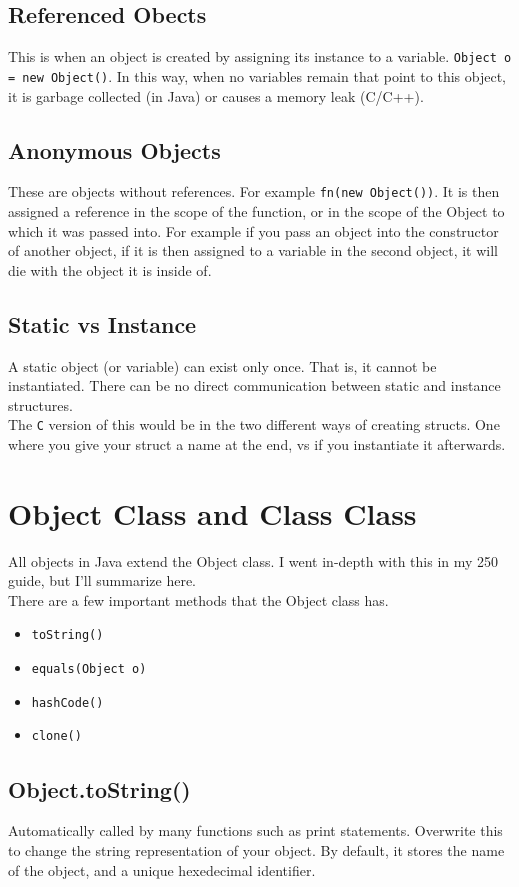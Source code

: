 \documentclass[12pt]{article}
\theoremstyle{definition}
\begin{document}
\subsection{Referenced Obects}
This is when an object is created by assigning its instance to a variable. \texttt{Object o = new Object()}. In this way, when no variables remain that point to this object, it is garbage collected (in Java) or causes a memory leak (C/C++).
\subsection{Anonymous Objects}
These are objects without references. For example \texttt{fn(new Object())}. It is then assigned a reference in the scope of the function, or in the scope of the Object to which it was passed into. For example if you pass an object into the constructor of another object, if it is then assigned to a variable in the second object, it will die with the object it is inside of.
\subsection{Static vs Instance}
A static object (or variable) can exist only once. That is, it cannot be instantiated. There can be no direct communication between static and instance structures.
\\ \linebreak
The \texttt{C} version of this would be in the two different ways of creating structs. One where you give your struct a name at the end, vs if you instantiate it afterwards.
\section{Object Class and Class Class}
All objects in Java extend the Object class. I went in-depth with this in my 250 guide, but I'll summarize here.
\\ \linebreak
There are a few important methods that the Object class has.
\begin{itemize}
	\item \texttt{toString()}
	\item \texttt{equals(Object o)}
	\item \texttt{hashCode()}
	\item \texttt{clone()}
\end{itemize}
\subsection{Object.toString()}
Automatically called by many functions such as print statements. Overwrite this to change the string representation of your object. By default, it stores the name of the object, and a unique hexedecimal identifier.
\end{document}
